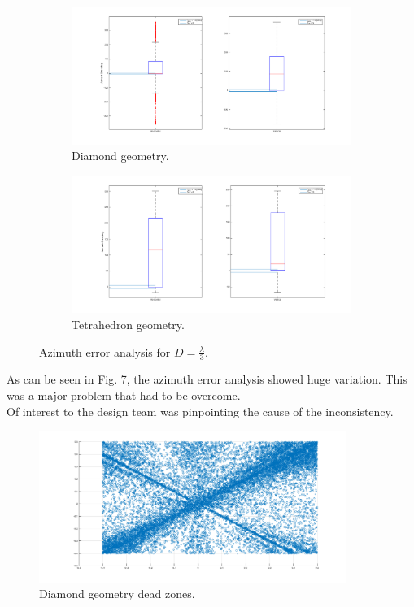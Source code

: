 \documentclass[12pt]{article}
\begin{document}
\begin{figure}[!h]
	\centering
	\begin{subfigure}{.5\textwidth}
  		\centering
  		\includegraphics[width=.85\linewidth]{Pics_and_Figs/Error_Analysis_Diamond_Third.png}
  		\caption{Diamond geometry.}
  		\label{fig:Error_Analysis_Diamond_Third}
	\end{subfigure}%
	\begin{subfigure}{.5\textwidth}
  		\centering
  		\includegraphics[width=.85\linewidth]{Pics_and_Figs/Error_Analysis_Tetra_Third.png}
  		\caption{Tetrahedron geometry.}
  		\label{fig:Error_Analysis_Tetra_Third}
	\end{subfigure}
	\caption{Azimuth error analysis for $D=\frac{\lambda}{3}$.}
\end{figure}

\noindent As can be seen in Fig. 7, the azimuth error analysis showed huge variation. This was a major problem that had to be overcome.\\

\noindent Of interest to the design team was pinpointing the cause of the inconsistency.

\begin{figure}[!h]
	\centering
	\includegraphics[width=10.0cm]{Pics_and_Figs/Diamond_Dead_Zones.png}
    \caption{Diamond geometry dead zones.} \label{fig:Dimaond_Dead_Zones}
\end{figure}
\end{document}

